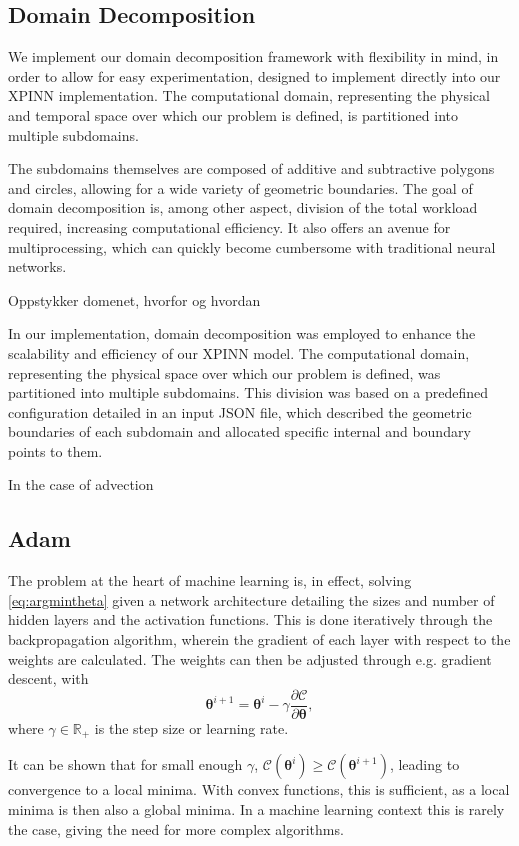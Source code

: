 \subsection{Domain Decomposition}
We implement our domain decomposition framework with flexibility in mind, in order to allow for easy experimentation, designed to implement directly into our XPINN implementation.
The computational domain, representing the physical and temporal space over which our problem is defined, is partitioned into multiple subdomains.

The subdomains themselves are composed of additive and subtractive polygons and circles, allowing for a wide variety of geometric boundaries.
The goal of domain decomposition is, among other aspect, division of the total workload required, increasing computational efficiency.
It also offers an avenue for multiprocessing, which can quickly become cumbersome with traditional neural networks.


Oppstykker domenet, hvorfor og hvordan

In our implementation, domain decomposition was employed to enhance the scalability and efficiency of our XPINN model. The computational domain, representing the physical space over which our problem is defined, was partitioned into multiple subdomains. This division was based on a predefined configuration detailed in an input JSON file, which described the geometric boundaries of each subdomain and allocated specific internal and boundary points to them.

In the case of advection

\subsection{Adam}
The problem at the heart of machine learning is, in effect, solving \autoref{eq:argmintheta} given a network architecture detailing the sizes and number of hidden layers and the activation functions.
This is done iteratively through the backpropagation algorithm, wherein the gradient of each layer with respect to the weights are calculated.
The weights can then be adjusted through e.g. gradient descent, with
\begin{equation}
    \boldsymbol{\theta}^{i+1} = \boldsymbol{\theta}^i - \gamma \frac{\partial \mathcal{C}}{\partial \boldsymbol{\theta}},
\end{equation}
where $\gamma \in \mathbb{R}_{+}$ is the step size or learning rate.

It can be shown that for small enough $\gamma$, $\mathcal{C}(\boldsymbol{\theta}^i) \geq \mathcal{C}(\boldsymbol{\theta}^{i+1})$, leading to convergence to a local minima.
With convex functions, this is sufficient, as a local minima is then also a global minima.
In a machine learning context this is rarely the case, giving the need for more complex algorithms.

